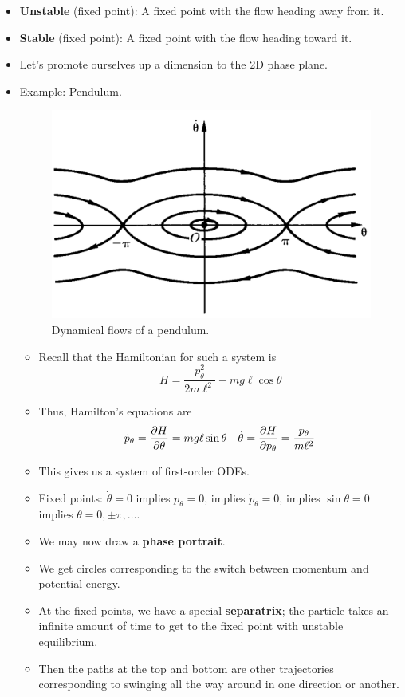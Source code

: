 \documentclass[../notes.tex]{subfiles}
\begin{document}
\begin{itemize}
    \item \textbf{Unstable} (fixed point): A fixed point with the flow heading away from it.
    \item\textbf{Stable} (fixed point): A fixed point with the flow heading toward it.
    \item Let's promote ourselves up a dimension to the 2D phase plane.
    \item Example: Pendulum.
    \begin{figure}[h!]
        \centering
        \includegraphics[width=0.4\linewidth]{../ExtFiles/flowsPendulum.png}
        \caption{Dynamical flows of a pendulum.}
        \label{fig:flowsPendulum}
    \end{figure}
    \begin{itemize}
        \item Recall that the Hamiltonian for such a system is
        \begin{equation*}
            H = \frac{p_\theta^2}{2m\ell^2}-mg\ell\cos\theta
        \end{equation*}
        \item Thus, Hamilton's equations are
        \begin{align*}
            -\dot{p}_\theta &= \pdv{H}{\theta} = mg\ell\sin\theta&
            \dot{\theta} &= \pdv{H}{p_\theta} = \frac{p_\theta}{m\ell^2}
        \end{align*}
        \item This gives us a system of first-order ODEs.
        \item Fixed points: $\dot{\theta}=0$ implies $p_\theta=0$, implies $\dot{p}_\theta=0$, implies $\sin\theta=0$ implies $\theta=0,\pm\pi,\dots$.
        \item We may now draw a \textbf{phase portrait}.
        \item We get circles corresponding to the switch between momentum and potential energy.
        \item At the fixed points, we have a special \textbf{separatrix}; the particle takes an infinite amount of time to get to the fixed point with unstable equilibrium.
        \item Then the paths at the top and bottom are other trajectories corresponding to swinging all the way around in one direction or another.

\end{itemize}
\end{itemize}
\end{document}
